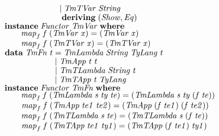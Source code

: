 \documentclass[10pt]{article}
\newcommand{\Conid}[1]{\mathit{#1}}
\newcommand{\Varid}[1]{\mathit{#1}}
\begin{document}
\begin{tabbing}
${\hskip1.00em\relax\phantom{\mathbf{data}\;\Conid{TmVar}\;\Varid{t}\mbox{}}\mid \Conid{TmTVar}\;\Conid{String}}$\\
${\hskip1.00em\relax\phantom{\mathbf{data}\;\Conid{TmVar}\;\Varid{t}\mbox{}}\phantom{\mid \mbox{}}\mathbf{deriving}\;(\Conid{Show},\Conid{Eq})}$\\
${}$\\
${\hskip1.00em\relax\mathbf{instance}\;\Conid{Functor}\;\Conid{TmVar}\;\mathbf{where}}$\\
${\hskip1.00em\relax\hskip2.00em\relax\Varid{map}_{f}\;\Varid{f}\;(\Conid{TmVar}\;\Varid{x})\mathrel{=}(\Conid{TmVar}\;\Varid{x})}$\\
${\hskip1.00em\relax\hskip2.00em\relax\Varid{map}_{f}\;\Varid{f}\;(\Conid{TmTVar}\;\Varid{x})\mathrel{=}(\Conid{TmTVar}\;\Varid{x})}$\\
${}$\\
${\hskip1.00em\relax\mathbf{data}\;\Conid{TmFn}\;\Varid{t}\mathrel{=}\Conid{TmLambda}\;\Conid{String}\;\Conid{TyLang}\;\Varid{t}}$\\
${\hskip1.00em\relax\phantom{\mathbf{data}\;\Conid{TmFn}\;\Varid{t}\mbox{}}\mid \Conid{TmApp}\;\Varid{t}\;\Varid{t}}$\\
${\hskip1.00em\relax\phantom{\mathbf{data}\;\Conid{TmFn}\;\Varid{t}\mbox{}}\mid \Conid{TmTLambda}\;\Conid{String}\;\Varid{t}}$\\
${\hskip1.00em\relax\phantom{\mathbf{data}\;\Conid{TmFn}\;\Varid{t}\mbox{}}\mid \Conid{TmTApp}\;\Varid{t}\;\Conid{TyLang}}$\\
${}$\\
${\hskip1.00em\relax\mathbf{instance}\;\Conid{Functor}\;\Conid{TmFn}\;\mathbf{where}}$\\
${\hskip1.00em\relax\hskip2.00em\relax\Varid{map}_{f}\;\Varid{f}\;(\Conid{TmLambda}\;\Varid{s}\;\Varid{ty}\;\Varid{te})\mathrel{=}(\Conid{TmLambda}\;\Varid{s}\;\Varid{ty}\;(\Varid{f}\;\Varid{te}))}$\\
${\hskip1.00em\relax\hskip2.00em\relax\Varid{map}_{f}\;\Varid{f}\;(\Conid{TmApp}\;\Varid{te1}\;\Varid{te2})\mathrel{=}(\Conid{TmApp}\;(\Varid{f}\;\Varid{te1})\;(\Varid{f}\;\Varid{te2}))}$\\
${\hskip1.00em\relax\hskip2.00em\relax\Varid{map}_{f}\;\Varid{f}\;(\Conid{TmTLambda}\;\Varid{s}\;\Varid{te})\mathrel{=}(\Conid{TmTLambda}\;\Varid{s}\;(\Varid{f}\;\Varid{te}))}$\\
${\hskip1.00em\relax\hskip2.00em\relax\Varid{map}_{f}\;\Varid{f}\;(\Conid{TmTApp}\;\Varid{te1}\;\Varid{ty1})\mathrel{=}(\Conid{TmTApp}\;(\Varid{f}\;\Varid{te1})\;\Varid{ty1})}$\\

\end{tabbing}
\end{document}
